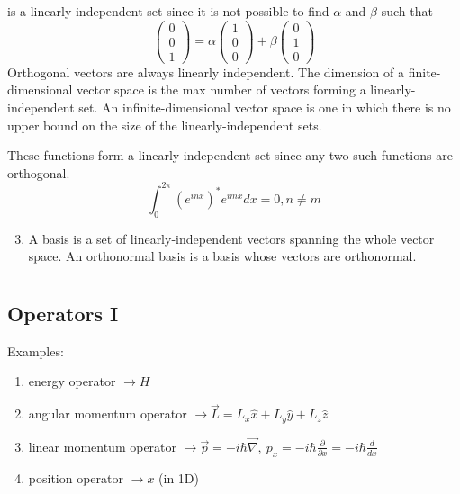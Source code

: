 \documentclass[a4paper,11pt,normalem]{article}
\begin{document}
is a linearly independent set since it is not possible to find
\(\alpha\) and \(\beta\) such that
\[
    \begin{pmatrix} 0 \\ 0 \\ 1 \end{pmatrix} = \alpha\begin{pmatrix} 1 \\ 0 \\ 0 \end{pmatrix} + \beta\begin{pmatrix} 0 \\ 1 \\ 0 \end{pmatrix}
\]
Orthogonal vectors are always linearly independent.
The dimension of a finite-dimensional vector space is the max number of
vectors forming a linearly-independent set.
An infinite-dimensional vector space is one in which there is no upper
bound on the size of the linearly-independent sets.

\begin{example}
These functions form a linearly-independent set since any two such
functions are orthogonal.
\[
    \int_0^{2\pi} \left(e^{inx}\right)^* e^{imx} dx = 0, n \neq m
\]
\end{example}

\begin{enumerate}
\setcounter{enumi}{2}
\item
  A basis is a set of linearly-independent vectors spanning the whole
  vector space.
  An orthonormal basis is a basis whose vectors are orthonormal.
\end{enumerate}

\section{}\label{lecture-4}

\subsection{Operators I}\label{operators-i}

Examples:
\begin{enumerate}
    \item energy operator \(\to H\) 
    \item angular momentum operator \(\to \vec{L} = L_x\hat{x} + L_y\hat{y} + L_z\hat{z}\) 
    \item linear momentum operator \(\to \vec{p} = -i\hbar\vec{\nabla},~ p_x = -i\hbar\frac{\partial}{\partial x} = -i\hbar\frac{d}{dx}\)
    \item position operator \(\to x\) (in 1D)
\end{enumerate}
\end{document}
